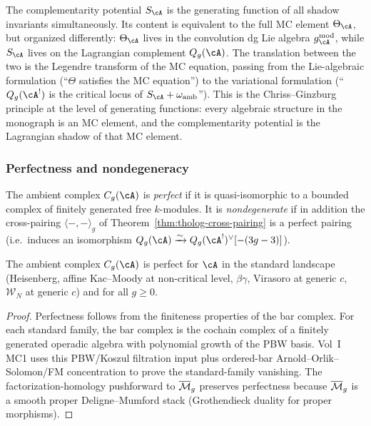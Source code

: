 \begin{remark}
The complementarity potential $S_\cA$ is the generating
function of all shadow invariants simultaneously.
Its content is equivalent to the full MC element $\Theta_\cA$,
but organized differently: $\Theta_\cA$ lives in the
convolution dg Lie algebra $g_\cA^{\mathrm{mod}}$, while
$S_\cA$ lives on the Lagrangian complement $Q_g(\cA)$.
The translation between the two is the Legendre transform
of the MC equation, passing from the Lie-algebraic
formulation (``$\Theta$ satisfies the MC equation'') to
the variational formulation (``$Q_g(\cA^!)$ is the critical
locus of $S_\cA + \omega_{\mathrm{amb}}$'').
This is the Chriss--Ginzburg principle at the level of
generating functions: every algebraic structure in the
monograph is an MC element, and the complementarity potential
is the Lagrangian shadow of that MC element.
\end{remark}

\subsubsection{Perfectness and nondegeneracy}

\begin{definition}
The ambient complex $C_g(\cA)$ is \emph{perfect} if it is
quasi-isomorphic to a bounded complex of finitely generated
free $k$-modules.
It is \emph{nondegenerate} if in addition the cross-pairing
$\langle -, - \rangle_g$ of
Theorem~\ref{thm:tholog-cross-pairing}
is a perfect pairing (i.e.\ induces an isomorphism
$Q_g(\cA) \xrightarrow{\sim} Q_g(\cA^!)^\vee[-(3g-3)]$).
\end{definition}

\begin{proposition}
The ambient complex $C_g(\cA)$ is perfect for $\cA$ in the
standard landscape (Heisenberg, affine Kac--Moody at
non-critical level, $\beta\gamma$, Virasoro at generic $c$,
$\mathcal{W}_N$ at generic $c$) and for all $g \geq 0$.
\end{proposition}

\begin{proof}
Perfectness follows from the finiteness properties of the
bar complex.
For each standard family, the bar complex is the cochain complex
of a finitely generated operadic algebra with polynomial growth
of the PBW basis. Vol~I MC1 uses this PBW/Koszul filtration input plus
ordered-bar Arnold--Orlik--Solomon/FM concentration to prove the
standard-family vanishing.
The factorization-homology pushforward to $\overline{\mathcal{M}}_g$ preserves
perfectness because $\overline{\mathcal{M}}_g$ is a smooth proper
Deligne--Mumford stack (Grothendieck duality for proper morphisms).
\end{proof}

